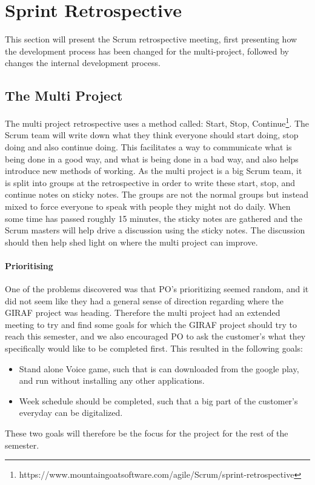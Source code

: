 \section{Sprint Retrospective}

This section will present the Scrum retrospective meeting, first presenting how the development process has been changed for the multi-project, followed by changes the internal development process.

\subsection{The Multi Project}

The multi project retrospective uses a method called: Start, Stop, Continue\footnote{https://www.mountaingoatsoftware.com/agile/Scrum/sprint-retrospective}.
The Scrum team will write down what they think everyone should start doing, stop doing and also continue doing. 
This facilitates a way to communicate what is being done in a good way, and what is being done in a bad way, and also helps introduce new methods of working.
As the multi project is a big Scrum team, it is split into groups at the retrospective in order to write these start, stop, and continue notes on sticky notes.
The groups are not the normal groups but instead mixed to force everyone to speak with people they might not do daily.
When some time has passed roughly 15 minutes, the sticky notes are gathered and the Scrum masters will help drive a discussion using the sticky notes.
The discussion should then help shed light on where the multi project can improve.

\paragraph{Prioritising} One of the problems discovered was that PO's prioritizing seemed random, and it did not seem like they had a general sense of direction regarding where the GIRAF project was heading.
Therefore the multi project had an extended meeting to try and find some goals for which the GIRAF project should try to reach this semester, and we also encouraged PO to ask the customer's what they specifically would like to be completed first.
This resulted in the following goals:
\begin{itemize}
	\item Stand alone Voice game, such that is can downloaded from the google play, and run without installing any other applications.
	\item Week schedule should be completed, such that a big part of the customer's everyday can be digitalized.
\end{itemize}
These two goals will therefore be the focus for the project for the rest of the semester. 

